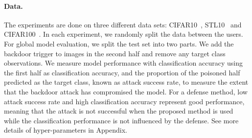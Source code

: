 \documentclass{article} %
\begin{document}


\vspace{-10pt}
\paragraph{Data.} The experiments are done on three different data sets: CIFAR10~\citep{krizhevsky2009learning}, STL10~\citep{coates2011analysis} and CIFAR100~\citep{krizhevsky2009learning}. In each experiment, we randomly split the data between the users. For global model evaluation, we split the test set into two parts. We add the backdoor trigger to images in the second half and remove any target class observations. We measure model performance with classification accuracy using the first half as {\color{blue}classification accuracy}, and the proportion of the poisoned half predicted as the target class, known as {\color{red}attack success rate}, to measure the extent that the backdoor attack has compromised the model. For a defense method, low attack success rate and high classification accuracy represent good performance, meaning that the attack is not successful when the proposed method is used while the classification performance is not influenced by the defense. See more details of hyper-parameters in Appendix.
\end{document}

